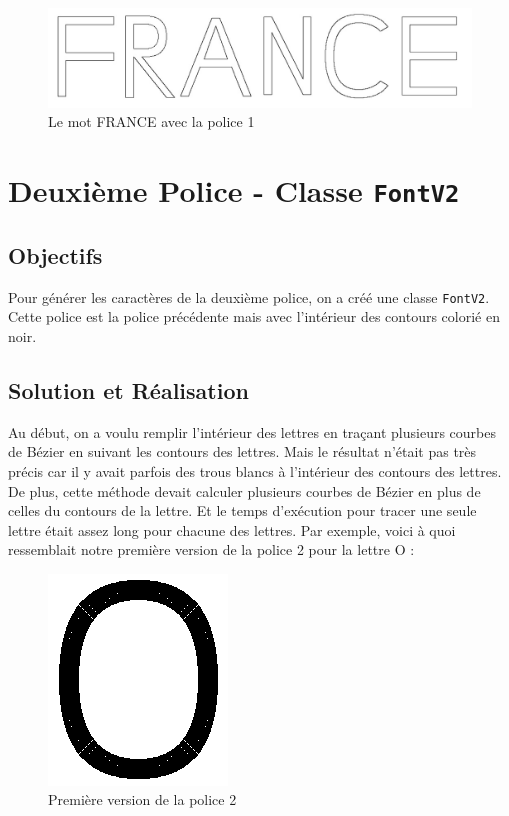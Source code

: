 \documentclass[a4paper, 12pt]{article}
\begin{document}
\begin{figure}[h]
\centering
\includegraphics[scale=0.5]{Images/FRANCE_FontV1.jpeg}
\caption{Le mot FRANCE avec la police 1}
\label{fig3}
\end{figure}

\newpage
\section{Deuxième Police - Classe \texttt{FontV2}}	
\subsection{Objectifs	}
Pour générer les caractères de la deuxième police, on a créé une classe \texttt{FontV2}. Cette police est la police précédente mais avec l'intérieur des contours colorié en noir.

\subsection{Solution et Réalisation}
Au début, on a voulu remplir l'intérieur des lettres en traçant plusieurs courbes de Bézier en suivant les contours des lettres. Mais le résultat n'était pas très précis car il y avait parfois des trous blancs à l'intérieur des contours des lettres. De plus, cette méthode devait calculer plusieurs courbes de Bézier en plus de celles du contours de la lettre. Et le temps d'exécution pour tracer une seule lettre était assez long pour chacune des lettres. Par exemple, voici à quoi ressemblait notre première version de la police 2 pour la lettre O : 

\begin{figure}[h]
\centering
\includegraphics[scale=0.9]{Images/FontV2_O_Old.png}
\caption{Première version de la police 2}
\label{fig4}
\end{figure}
\end{document}

